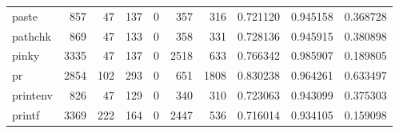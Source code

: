 \begin{longtable}{lrrrrrrrrr}
paste     &                                 857 &                                              47 &                                            137 &                                             0 &                                            357 &                                          316 &                                           0.721120 &                               0.945158 &                             0.368728 \\
pathchk   &                                 869 &                                              47 &                                            133 &                                             0 &                                            358 &                                          331 &                                           0.728136 &                               0.945915 &                             0.380898 \\
pinky     &                                3335 &                                              47 &                                            137 &                                             0 &                                           2518 &                                          633 &                                           0.766342 &                               0.985907 &                             0.189805 \\
pr        &                                2854 &                                             102 &                                            293 &                                             0 &                                            651 &                                         1808 &                                           0.830238 &                               0.964261 &                             0.633497 \\
printenv  &                                 826 &                                              47 &                                            129 &                                             0 &                                            340 &                                          310 &                                           0.723063 &                               0.943099 &                             0.375303 \\
printf    &                                3369 &                                             222 &                                            164 &                                             0 &                                           2447 &                                          536 &                                           0.716014 &                               0.934105 &                             0.159098 \\

\end{longtable}
